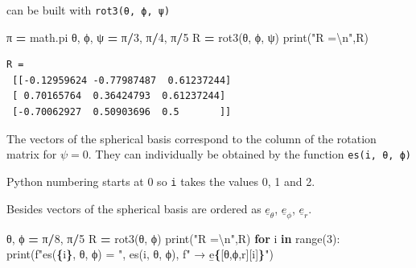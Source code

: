 \documentclass[
  a4paper,
  numbers=noendperiod,
  DIV=12]{scrreprt}
\newenvironment{Shaded}{\begin{snugshade}}{\end{snugshade}}
\newcommand{\BuiltInTok}[1]{#1}
\newcommand{\CharTok}[1]{\textcolor[rgb]{0.31,0.60,0.02}{#1}}
\newcommand{\ControlFlowTok}[1]{\textcolor[rgb]{0.13,0.29,0.53}{\textbf{#1}}}
\newcommand{\DecValTok}[1]{\textcolor[rgb]{0.00,0.00,0.81}{#1}}
\newcommand{\KeywordTok}[1]{\textcolor[rgb]{0.13,0.29,0.53}{\textbf{#1}}}
\newcommand{\NormalTok}[1]{#1}
\newcommand{\OperatorTok}[1]{\textcolor[rgb]{0.81,0.36,0.00}{\textbf{#1}}}
\newcommand{\SpecialCharTok}[1]{\textcolor[rgb]{0.81,0.36,0.00}{\textbf{#1}}}
\newcommand{\SpecialStringTok}[1]{\textcolor[rgb]{0.31,0.60,0.02}{#1}}
\newcommand{\StringTok}[1]{\textcolor[rgb]{0.31,0.60,0.02}{#1}}
\newcommand{\uv}[1]{{\underline{{#1}}}}
\newcommand{\ve}[1]{{\uv{{e}}_{{#1}}}}
\begin{document}
can be built with \texttt{rot3(θ,\ ϕ,\ ψ)}

\begin{Shaded}
\begin{Highlighting}[]
\NormalTok{π }\OperatorTok{=}\NormalTok{ math.pi}
\NormalTok{θ, ϕ, ψ }\OperatorTok{=}\NormalTok{ π}\OperatorTok{/}\DecValTok{3}\NormalTok{, π}\OperatorTok{/}\DecValTok{4}\NormalTok{, π}\OperatorTok{/}\DecValTok{5}
\NormalTok{R }\OperatorTok{=}\NormalTok{ rot3(θ, ϕ, ψ)}
\BuiltInTok{print}\NormalTok{(}\StringTok{"R =}\CharTok{\textbackslash{}n}\StringTok{"}\NormalTok{,R)}
\end{Highlighting}
\end{Shaded}

\begin{verbatim}
R =
 [[-0.12959624 -0.77987487  0.61237244]
 [ 0.70165764  0.36424793  0.61237244]
 [-0.70062927  0.50903696  0.5       ]]
\end{verbatim}

The vectors of the spherical basis correspond to the column of the
rotation matrix for \(\psi=0\). They can individually be obtained by the
function \texttt{es(i,\ θ,\ ϕ)}

\begin{tcolorbox}[enhanced jigsaw, arc=.35mm, bottomrule=.15mm, bottomtitle=1mm, breakable, colback=white, colbacktitle=quarto-callout-warning-color!10!white, colframe=quarto-callout-warning-color-frame, coltitle=black, left=2mm, leftrule=.75mm, opacityback=0, opacitybacktitle=0.6, rightrule=.15mm, title=\textcolor{quarto-callout-warning-color}{\faExclamationTriangle}\hspace{0.5em}{Warning}, titlerule=0mm, toprule=.15mm, toptitle=1mm]

Python numbering starts at 0 so \texttt{i} takes the values 0, 1 and 2.

Besides vectors of the spherical basis are ordered as \(\ve{\theta}\),
\(\ve{\phi}\), \(\ve{r}\).

\end{tcolorbox}

\begin{Shaded}
\begin{Highlighting}[]
\NormalTok{θ, ϕ }\OperatorTok{=}\NormalTok{ π}\OperatorTok{/}\DecValTok{8}\NormalTok{, π}\OperatorTok{/}\DecValTok{5}
\NormalTok{R }\OperatorTok{=}\NormalTok{ rot3(θ, ϕ)}
\BuiltInTok{print}\NormalTok{(}\StringTok{"R =}\CharTok{\textbackslash{}n}\StringTok{"}\NormalTok{,R)}
\ControlFlowTok{for}\NormalTok{ i }\KeywordTok{in} \BuiltInTok{range}\NormalTok{(}\DecValTok{3}\NormalTok{): }\BuiltInTok{print}\NormalTok{(}\SpecialStringTok{f"es(}\SpecialCharTok{\{}\NormalTok{i}\SpecialCharTok{\}}\SpecialStringTok{, θ, ϕ) = "}\NormalTok{, es(i, θ, ϕ), }\SpecialStringTok{f" → e̱}\SpecialCharTok{\{}\NormalTok{[}\StringTok{\textquotesingle{}θ\textquotesingle{}}\NormalTok{,}\StringTok{\textquotesingle{}ϕ\textquotesingle{}}\NormalTok{,}\StringTok{\textquotesingle{}r\textquotesingle{}}\NormalTok{][i]}\SpecialCharTok{\}}\SpecialStringTok{"}\NormalTok{)}
\end{Highlighting}
\end{Shaded}
\end{document}
